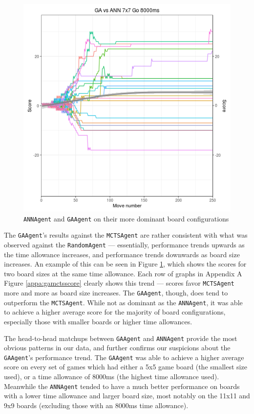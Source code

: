 \begin{figure}[h]
\begin{minipage}{.45\textwidth}
  \includegraphics[scale=0.4]{images/Visualizations/GAvsANN/8000ms7x7.png}
\end{minipage}
\caption{\texttt{ANNAgent} and \texttt{GAAgent} on their more dominant board configurations}
\label{fig:gamcts}
\end{figure}

The \texttt{GAAgent}'s results against the \texttt{MCTSAgent} are rather consistent with what was observed against the \texttt{RandomAgent} --- essentially, performance trends upwards as the time allowance increases, and performance trends downwards as board size increases.  An example of this can be seen in Figure \ref{fig:gamcts}, which shows the scores for two board sizes at the same time allowance.  Each row of graphs in Appendix A Figure \ref{appa:gamctsscore} clearly shows this trend --- scores favor \texttt{MCTSAgent} more and more as board size increases.  The \texttt{GAAgent}, though, does tend to outperform the \texttt{MCTSAgent}.  While not as dominant as the \texttt{ANNAgent}, it was able to achieve a higher average score for the majority of board configurations, especially those with smaller boards or higher time allowances.

The head-to-head matchups between \texttt{GAAgent} and \texttt{ANNAgent} provide the most obvious patterns in our data, and further confirms our suspicions about the \texttt{GAAgent}'s performance trend.  The \texttt{GAAgent} was able to achieve a higher average score on every set of games which had either a 5x5 game board (the smallest size used), or a time allowance of 8000ms (the highest time allowance used).  Meanwhile the \texttt{ANNAgent} tended to have a much better performance on boards with a lower time allowance and larger board size, most notably on the 11x11 and 9x9 boards (excluding those with an 8000ms time allowance).

